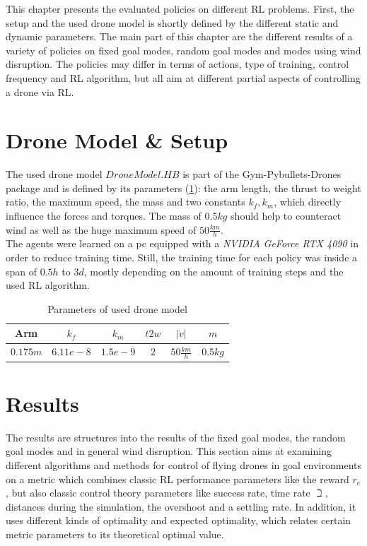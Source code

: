 This chapter presents the evaluated policies on different RL problems. 
First, the setup and the used drone model is shortly defined by the different static and dynamic parameters. 
The main part of this chapter are the different results of a variety of policies on fixed goal modes, random goal modes and modes using wind disruption. 
The policies may differ in terms of actions, type of training, control frequency and RL algorithm, but all aim at different partial aspects of controlling a drone via RL.

\section{Drone Model \& Setup}
The used drone model $DroneModel.HB$ is part of the Gym-Pybullets-Drones package and is defined by its parameters (\cref{tab:drone}): 
the arm length, the thrust to weight ratio, the maximum speed, the mass and two constants $k_f, k_m$, which directly influence the forces and torques.
The mass of $0.5kg$ should help to counteract wind as well as the huge maximum speed of $50 \frac{km}{h}$.\\
The agents were learned on a pc equipped with a \emph{NVIDIA GeForce RTX 4090} in order to reduce training time. 
Still, the training time for each policy was inside a span of $0.5h$ to $3d$, mostly depending on the amount of training steps and the used RL algorithm.

\begin{table}
	\centering
	\caption{Parameters of used drone model}\label{tab:drone}
	\begin{tabular}{|c|c|c|c|c|c|}
		\hline
		Arm & $k_f$& $k_m$ & $t2w$ & $|\dot{v}|$ & $m$ \\
		\hline
		$0.175m$ & $6.11e-8$ & $1.5e-9$ & $2$ & $50 \frac{km}{h}$ & $0.5 kg$\\
		\hline
	\end{tabular}
\end{table}


\section{Results}
The results are structures into the results of the fixed goal modes, the random goal modes and in general wind disruption. 
This section aims at examining different algorithms and methods for control of flying drones in goal environments 
on a metric which combines classic RL performance parameters like the reward $r_e$, but also classic control theory parameters like 
success rate, time rate $\beth$, distances during the simulation, the overshoot and a settling rate. 
In addition, it uses different kinds of optimality and expected optimality, 
which relates certain metric parameters to its theoretical optimal value.

